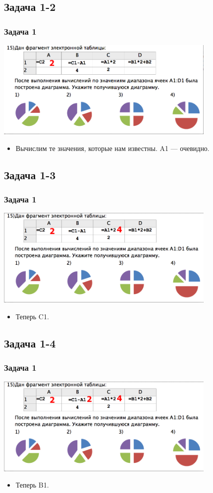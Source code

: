 \documentclass[compress,red]{beamer}
\begin{document}
\subsection{Задача 1-2}
\begin{frame}[fragile]
  \frametitle{Задача 1}
  \centerline{\includegraphics[width=0.8\textwidth]{images/07-1.png}}
  \begin{itemize}
      \item Вычислим те значения, которые нам известны. A1 --- очевидно.
  \end{itemize}
\end{frame}

\subsection{Задача 1-3}
\begin{frame}[fragile]
  \frametitle{Задача 1}
  \centerline{\includegraphics[width=0.8\textwidth]{images/07-2.png}}
  \begin{itemize}
      \item Теперь C1.
  \end{itemize}
\end{frame}

\subsection{Задача 1-4}
\begin{frame}[fragile]
  \frametitle{Задача 1}
  \centerline{\includegraphics[width=0.8\textwidth]{images/07-3.png}}
  \begin{itemize}
      \item Теперь B1.
  \end{itemize}
\end{frame}
\end{document}

